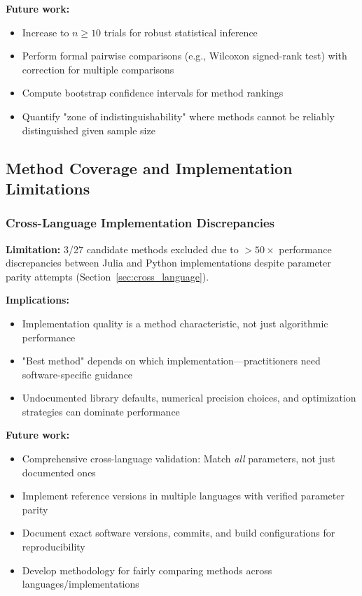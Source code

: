 \textbf{Future work:}
\begin{itemize}
    \item Increase to $n \geq 10$ trials for robust statistical inference
    \item Perform formal pairwise comparisons (e.g., Wilcoxon signed-rank test) with correction for multiple comparisons
    \item Compute bootstrap confidence intervals for method rankings
    \item Quantify "zone of indistinguishability" where methods cannot be reliably distinguished given sample size
\end{itemize}

\subsection{Method Coverage and Implementation Limitations}

\subsubsection{Cross-Language Implementation Discrepancies}

\textbf{Limitation:} 3/27 candidate methods excluded due to $>50\times$ performance discrepancies between Julia and Python implementations despite parameter parity attempts (Section~\ref{sec:cross_language}).

\textbf{Implications:}
\begin{itemize}
    \item Implementation quality is a method characteristic, not just algorithmic performance
    \item "Best method" depends on which implementation—practitioners need software-specific guidance
    \item Undocumented library defaults, numerical precision choices, and optimization strategies can dominate performance
\end{itemize}

\textbf{Future work:}
\begin{itemize}
    \item Comprehensive cross-language validation: Match \textit{all} parameters, not just documented ones
    \item Implement reference versions in multiple languages with verified parameter parity
    \item Document exact software versions, commits, and build configurations for reproducibility
    \item Develop methodology for fairly comparing methods across languages/implementations
\end{itemize}

